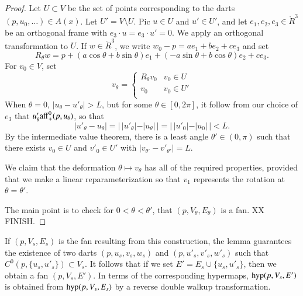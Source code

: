 \begin{proof}
Let $U\subset V$ be the set of points corresponding
to the darts $(p,u_0,\ldots)\in A(x)$.  Let $U'=V\setminus U$.
Pic $u\in U$ and $u'\in U'$, and let $e_1,e_2,e_3\in\ring{R}^3$ be 
an orthogonal frame with $e_3\cdot u = e_3\cdot u' = 0$.
We apply an orthogonal transformation to $U$.
If $w\in\ring{R}^3$, we write
$w_0-p = a e_1 + b e_2 + c e_3$ and set
$$R_\theta w = p + (a\cos\theta+b\sin\theta) e_1 +
   (-a\sin\theta+b\cos\theta) e_2 + c e_3.$$
For $v_0\in V$, set
  $$
  v_\theta = \begin{cases}
    R_\theta v_0 & v_0\in U\\
    v_0 & v_0\in U'\\
    \end{cases}
  $$
When $\theta=0$, $|u_\theta-u'_\theta|>L$, but for some $\theta\in[0,2\pi]$,
it follow from our choice of $e_3$ that
$u'_\theta{\operatorname{aff}}_+^0(p,u_\theta)$, so that
$$|u'_\theta - u_\theta| = |\,|u'_\theta| - |u_\theta|\,|
  = |\,|u'_0| - |u_0|\,| < L.$$
By the intermediate value theorem, there is a least angle
$\theta'\in(0,\pi)$ such that there exists $v_0\in U$
and $v'_0\in U'$ with $|v_{\theta'}-v'_{\theta'}|=L$.

We claim that the deformation $\theta\mapsto v_\theta$
has all of the required properties, provided that we make
a linear reparameterization so that $v_1$ represents the
rotation at $\theta=\theta'$.

The main point is to check for $0 < \theta < \theta'$,
that $(p,V_\theta,E_\theta)$ is a fan.
XX FINISH.
\end{proof}

If $(p,V_s,E_s)$ is the fan resulting from
this construction, the lemma guarantees the existence
of two darts $(p,u_s,v_s,w_s)$ and $(p,u'_s,v'_s,w'_s)$
such that $C^0(p,\{u_s,u'_s\})\subset V_s$.  It follows
that if we set $E' = E_s \cup \{u_s,u'_s\}$, then we obtain
a fan $(p,V_s,E')$.  In terms of the 
corresponding hypermaps, ${\operatorname{hyp}}(p,V_s,E')$ is obtained from
${\operatorname{hyp}}(p,V_s,E_s)$ by a reverse double walkup transformation.

